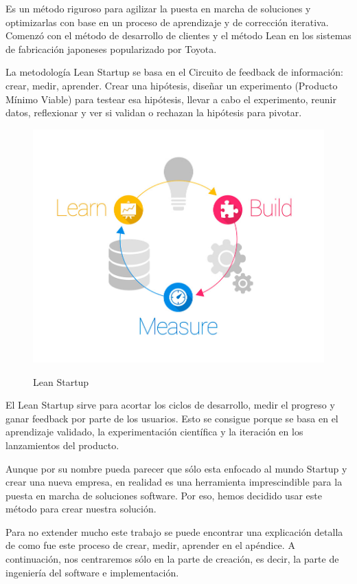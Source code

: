 \documentclass[12pt,twoside,titlepage]{report}
\begin{document}
Es un método riguroso para agilizar la puesta en marcha de soluciones y optimizarlas con base en un proceso de aprendizaje y de corrección iterativa. Comenzó con el método de desarrollo de clientes y el método Lean en los sistemas de fabricación japoneses popularizado por Toyota.

La metodología Lean Startup se basa en el Circuito de feedback de información: crear, medir, aprender. Crear una hipótesis, diseñar un experimento (Producto Mínimo Viable) para testear esa hipótesis, llevar a cabo el experimento, reunir datos, reflexionar y ver si validan o rechazan la hipótesis para pivotar.

\begin{figure}[H]
    \centering
    \includegraphics[scale=0.3]{Lean Startup/CircuitoFeedback}
    \label{fig:LeanStartup}
    \caption{Lean Startup}
\end{figure}

El Lean Startup sirve para acortar los ciclos de desarrollo, medir el progreso y ganar feedback por parte de los usuarios. Esto se consigue porque se basa en el aprendizaje validado, la experimentación científica y la iteración en los lanzamientos del producto. 

Aunque por su nombre pueda parecer que sólo esta enfocado al mundo Startup y crear una nueva empresa, en realidad es una herramienta imprescindible para la puesta en marcha de soluciones software. Por eso, hemos decidido usar este método para crear nuestra solución.

Para no extender mucho este trabajo se puede encontrar una explicación detalla de como fue este proceso de crear, medir, aprender en el apéndice. A continuación, nos centraremos sólo en la parte de creación, es decir, la parte de ingeniería del software e implementación.
\end{document}
